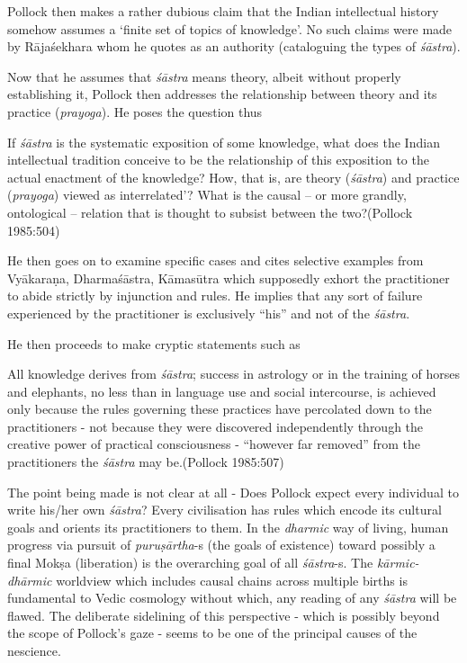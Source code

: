 Pollock then makes a rather dubious claim that the Indian intellectual history somehow assumes a `finite set of topics of knowledge'. No such claims were made by Rājaśekhara whom he quotes as an authority (cataloguing the types of {\sl śāstra}).

Now that he assumes that {\sl śāstra} means theory, albeit without properly establishing it, Pollock then addresses the relationship between theory and its practice ({\sl prayoga}). He poses the question thus 
\begin{myquote}
If {\sl śāstra} is the systematic exposition of some knowledge, what does the Indian intellectual tradition conceive to be the relationship of this exposition to the actual enactment of the knowledge? How, that is, are theory ({\sl śāstra}) and practice ({\sl prayoga}) viewed as interrelated'? What is the causal -- or more grandly, ontological -- relation that is thought to subsist between the two?\hfill (Pollock 1985:504)
\end{myquote}

He then goes on to examine specific cases and cites selective examples from Vyākaraṇa, Dharmaśāstra, Kāmasūtra which supposedly exhort the practitioner to abide strictly by injunction and rules. He implies that any sort of failure experienced by the practitioner is exclusively ``his'' and not of the {\sl śāstra}.

He then proceeds to make cryptic statements such as 
\begin{myquote}
All knowledge derives from {\sl śāstra}; success in astrology or in the training of horses and elephants, no less than in language use and social intercourse, is achieved only because the rules governing these practices have percolated down to the practitioners - not because they were discovered independently through the creative power of practical consciousness - ``however far removed'' from the practitioners the {\sl śāstra} may be.\hfill (Pollock 1985:507)
\end{myquote}

The point being made is not clear at all - Does Pollock expect every individual to write his/her own {\sl śāstra}? Every civilisation has rules which encode its cultural goals and orients its practitioners to them. In the {\sl dharmic} way of living, human progress via pursuit of {\sl puruṣārtha}-s (the goals of existence) toward possibly a final Mokṣa (liberation) is the overarching goal of all {\sl śāstra}-s. The {\sl kārmic-dhārmic} worldview which includes causal chains across multiple births is fundamental to Vedic cosmology without which, any reading of any {\sl śāstra} will be flawed. The deliberate sidelining of this perspective - which is possibly beyond the scope of Pollock's gaze - seems to be one of the principal causes of the nescience.

